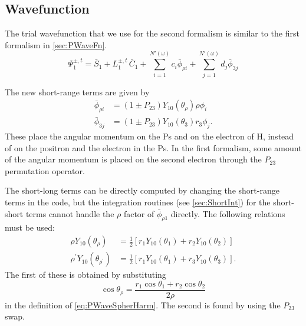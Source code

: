 \documentclass[Dissertation.tex]{subfiles}
\begin{document}
\subsection{Wavefunction}
The trial wavefunction that we use for the second formalism is similar to the first formalism in \cref{sec:PWaveFn}.
\begin{equation}
\Psi_1^{\pm,t} = \bar{S}_1 + L_1^{\pm,t} \, \bar{C}_1 + \sum_{i=1}^{N'(\omega)} c_i \bar{\phi}_{\rho i} + \sum_{j=1}^{N'(\omega)} d_j \bar{\phi}_{3j}
\label{eq:PWave2ndWavefn}
\end{equation}

\noindent The new short-range terms are given by
\begin{subequations}
\label{eq:PWave2ndPhiBar}
\begin{align}
\bar{\phi}_{\rho i} &= \left(1 \pm P_{23}\right) Y_{10}(\theta_\rho) \rho \phi_i \label{eq:PWave2ndPhi1i}\\
\bar{\phi}_{3j} &= \left(1 \pm P_{23}\right) Y_{10}(\theta_3) r_3 \phi_j \label{eq:PWave2ndPhi2j}.
\end{align}
\end{subequations}
These place the angular momentum on the Ps and on the electron of H, instead of on the positron and the electron in the Ps. In the first formalism, some amount of the angular momentum is placed on the second electron through the $P_{23}$ permutation operator.

The short-long terms can be directly computed by changing the short-range terms in the code, but the integration routines (see \cref{sec:ShortInt}) for the short-short terms cannot handle the $\rho$ factor of $\bar{\phi}_{\rho 1}$ directly. The following relations must be used:  
\begin{subequations}
\label{eq:P2rhoY10}
\begin{align}
\rho Y_{10}(\theta_\rho) &= \frac{1}{2}\left[ r_1 Y_{10}(\theta_1) + r_2 Y_{10}(\theta_2) \right] \\
\rho^\prime Y_{10}(\theta_{\rho^\prime}) &= \frac{1}{2}\left[ r_1 Y_{10}(\theta_1) + r_3 Y_{10}(\theta_3) \right].
\end{align}
\end{subequations}
The first of these is obtained by substituting
\begin{equation}
\label{eq:CosRho}
\cos\theta_\rho = \frac{r_1 \cos\theta_1 + r_2 \cos\theta_2}{2\rho}
\end{equation}
in the definition of \cref{eq:PWaveSpherHarm}. The second is found by using the $P_{23}$ swap.
\end{document}
